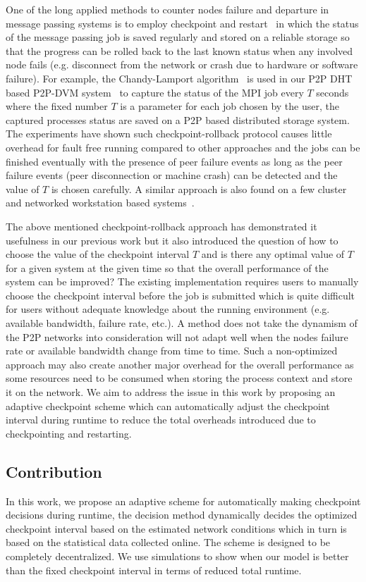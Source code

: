 \documentclass[times, 12pt, onecolumn]{article}
\begin{document}
One of the long applied methods to counter nodes failure and departure in message passing systems is to 
employ checkpoint and restart~\cite{DBLP:journals/csur/ElnozahyAWJ02,ChandyL85} in which the status of the 
message passing job is saved regularly and stored on a reliable storage so that the progress can be rolled back 
to the last known status when any involved node fails (e.g. disconnect from the network or crash due to hardware 
or software failure). For example, the Chandy-Lamport algorithm~\cite{ChandyL85} is used in our P2P DHT based 
P2P-DVM system~\cite{dvm} to capture the status of the MPI job every $T$ seconds where the fixed number $T$ is 
a parameter for each job chosen by the user, the captured processes status are saved on a P2P based distributed
storage system. The experiments have shown such checkpoint-rollback protocol causes little overhead for fault free 
running compared to other approaches and the jobs can be finished eventually with the presence of peer failure events 
as long as the peer failure events (peer disconnection or machine crash) can be detected and the value of $T$ is
chosen carefully. A similar approach is also found on a few cluster and networked workstation based systems~\cite{BHKLC06}. 

The above mentioned checkpoint-rollback approach has demonstrated it usefulness in our previous work but it 
also introduced the question of how to choose the value of the checkpoint interval $T$ and is there any 
optimal value of $T$ for a given system at the given time so that the overall performance of the system can be 
improved? The existing implementation requires users to manually choose the checkpoint interval before the job is 
submitted which is quite difficult for 
users without adequate knowledge about the running environment (e.g. available bandwidth, failure rate, etc.). 
A method does not take the dynamism of the P2P networks into consideration will not adapt 
well when the nodes failure rate or available bandwidth change from time to time. Such a non-optimized approach
may also create another major overhead for the overall performance as some resources need to be consumed when storing
the process context and store it on the network. We aim to address the issue in this work by proposing an 
adaptive checkpoint scheme which can automatically adjust the checkpoint interval during runtime to reduce the 
total overheads introduced due to checkpointing and restarting.    

\subsection{Contribution}
In this work, we propose an adaptive scheme for automatically making checkpoint decisions during runtime, 
the decision method dynamically decides the optimized checkpoint interval based on the estimated network 
conditions which in turn is based on the statistical data collected online. The scheme is designed to be
completely decentralized. We use simulations to show when our model is better than the fixed checkpoint 
interval in terms of reduced total runtime.   
\end{document}
